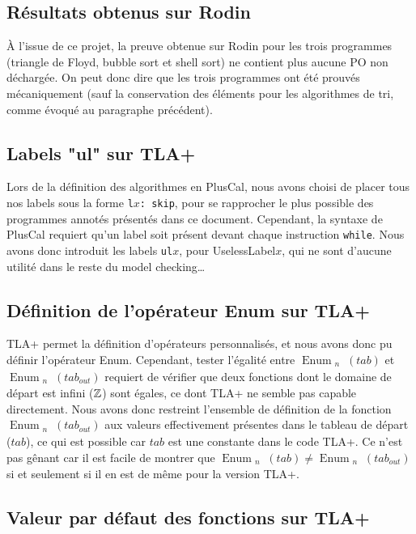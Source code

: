 \documentclass[a4paper, 11pt]{article}
\DeclareMathOperator{\eenu}{Enum}
\newcommand{\enu}[2]{\eenu_{\substack{#1}}\left(#2\right)}
\theoremstyle{mystyle}
\begin{document}
\subsection{Résultats obtenus sur Rodin}

\`A l'issue de ce projet, la preuve obtenue sur Rodin pour les trois programmes (triangle de Floyd, bubble sort et shell sort) ne contient plus aucune PO non déchargée. On peut donc dire que les trois programmes ont été prouvés mécaniquement (sauf la conservation des éléments pour les algorithmes de tri, comme évoqué au paragraphe précédent).

\subsection{Labels "ul" sur TLA+}

Lors de la définition des algorithmes en PlusCal, nous avons choisi de placer tous nos labels sous la forme \texttt{l$x$: skip}, pour se rapprocher le plus possible des programmes annotés présentés dans ce document. Cependant, la syntaxe de PlusCal requiert qu'un label soit présent devant chaque instruction \texttt{while}. Nous avons donc introduit les labels \texttt{ul$x$}, pour UselessLabel$x$, qui ne sont d'aucune utilité dans le reste du model checking\ldots{}

\subsection{Définition de l'opérateur Enum sur TLA+}

TLA+ permet la définition d'opérateurs personnalisés, et nous avons donc pu définir l'opérateur Enum. Cependant, tester l'égalité entre $\enu{n}{tab}$ et $\enu{n}{tab_{out}}$ requiert de vérifier que deux fonctions dont le domaine de départ est infini ($\mathbb{Z}$) sont égales, ce dont TLA+ ne semble pas capable directement. Nous avons donc restreint l'ensemble de définition de la fonction $\enu{n}{tab_{out}}$ aux valeurs effectivement présentes dans le tableau de départ ($tab$), ce qui est possible car $tab$ est une constante dans le code TLA+. Ce n'est pas gênant car il est facile de montrer que $\enu{n}{tab} \neq \enu{n}{tab_{out}}$ si et seulement si il en est de même pour la version TLA+.

\subsection{Valeur par défaut des fonctions sur TLA+}
\end{document}
